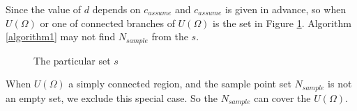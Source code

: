 Since the value of $d$ depends on $c_{assume}$ and $c_{assume}$ is given in advance, so when $U(\Omega)$ or one of connected branches of $U(\Omega)$ is the set in Figure \ref{the particular region}. Algorithm \ref{algorithm1} may not find $N_{sample}$ from the $s$.
\begin{figure}[H] 
	\caption{\label{the particular region} The particular set $s$}
\end{figure}
When $U(\Omega )$ a simply connected region, and the sample point set ${N_{sample}}$ is not an empty set, we exclude this special case. So the ${N_{sample}}$ can cover the $U(\Omega )$. 

